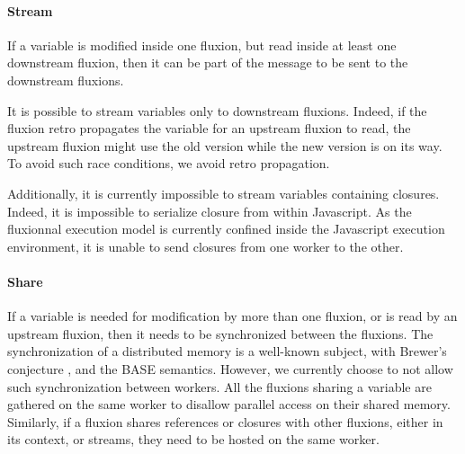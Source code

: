 \paragraph{Stream}
If a variable is modified inside one fluxion, but read inside at least one downstream fluxion, then it can be part of the message to be sent to the downstream fluxions.

It is possible to stream variables only to downstream flux\-ions.
Indeed, if the fluxion retro propagates the variable for an upstream fluxion to read, the upstream fluxion might use the old version while the new version is on its way.
To avoid such race conditions, we avoid retro propagation.

Additionally, it is currently impossible to stream variables containing closures.
Indeed, it is impossible to serialize closure from within Javascript.
As the fluxionnal execution model is currently confined inside the Javascript execution environment, it is unable to send closures from one worker to the other.

\paragraph{Share}
If a variable is needed for modification by more than one fluxion, or is read by an upstream fluxion, then it needs to be synchronized between the fluxions.
The synchronization of a distributed memory is a well-known subject, with Brewer's conjecture \cite{Gilbert2002}, and the BASE semantics\cite{Fox1997}.
However, we currently choose to not allow such synchronization between workers.
All the fluxions sharing a variable are gathered on the same worker to disallow parallel access on their shared memory.
Similarly, if a fluxion shares references or closures with other fluxions, either in its context, or streams, they need to be hosted on the same worker.


















\endinput

























